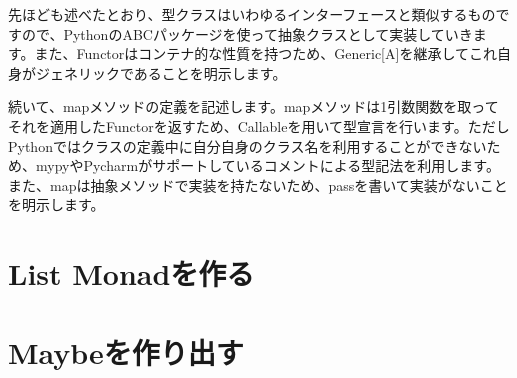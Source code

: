 
先ほども述べたとおり、型クラスはいわゆるインターフェースと類似するものですので、PythonのABCパッケージを使って抽象クラスとして実装していきます。また、Functorはコンテナ的な性質を持つため、Generic[A]を継承してこれ自身がジェネリックであることを明示します。

続いて、mapメソッドの定義を記述します。mapメソッドは1引数関数を取ってそれを適用したFunctorを返すため、Callableを用いて型宣言を行います。ただしPythonではクラスの定義中に自分自身のクラス名を利用することができないため、mypyやPycharmがサポートしているコメントによる型記法を利用します。また、mapは抽象メソッドで実装を持たないため、passを書いて実装がないことを明示します。

\section{List Monadを作る}


\section{Maybeを作り出す}

